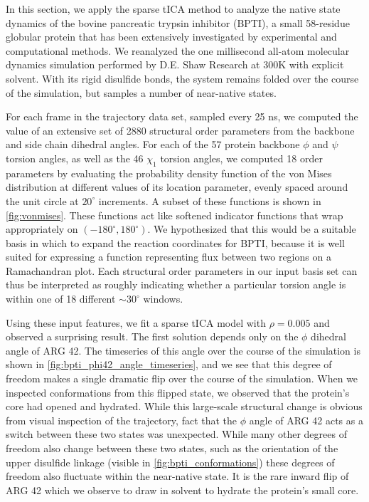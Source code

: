 \documentclass[aip, jcp, reprint, nolinenumbers, twocolumn, nobalancelastpage, nofootinbib]{revtex4-1}
\begin{document}
In this section, we apply the sparse tICA method to analyze the native state dynamics of the bovine pancreatic trypsin inhibitor (BPTI), a small 58-residue globular protein that has been extensively investigated by experimental and computational methods. We reanalyzed the one millisecond all-atom molecular dynamics simulation performed by D.E. Shaw Research at 300K with explicit solvent.\cite{shaw2010atomic}  With its rigid disulfide bonds, the system remains folded over the course of the simulation, but samples a number of near-native states.

For each frame in the trajectory data set, sampled every 25 ns, we computed the value of an extensive set of 2880 structural order parameters from the backbone and side chain dihedral angles. For each of the 57 protein backbone $\phi$ and $\psi$ torsion angles, as well as the 46 $\chi_1$ torsion angles, we computed 18 order parameters by evaluating the probability density function of the von Mises distribution at different values of its location parameter, evenly spaced around the unit circle at $20^\circ$ increments. A subset of these functions is shown in \cref{fig:vonmises}. These functions act like softened indicator functions that wrap appropriately on $(-180^\circ, 180^\circ)$. We hypothesized that this would be a suitable basis in which to expand the reaction coordinates for BPTI, because it is well suited for expressing a function representing flux between two regions on a Ramachandran plot. Each structural order parameters in our input basis set can thus be interpreted as roughly indicating whether a particular torsion angle is within one of 18 different $\sim 30^\circ$ windows.

Using these input features, we fit a sparse tICA model with $\rho=0.005$ and observed a surprising result. The first solution depends only on the $\phi$ dihedral angle of ARG 42. The timeseries of this angle over the course of the simulation is shown in \cref{fig:bpti_phi42_angle_timeseries}, and we see that this degree of freedom makes a single dramatic flip over the course of the simulation. When we inspected conformations from this flipped state, we observed that the protein's core had opened and hydrated. While this large-scale structural change is obvious from visual inspection of the trajectory, fact that the $\phi$ angle of ARG 42 acts as a switch between these two states was unexpected. While many other degrees of freedom also change between these two states, such as the orientation of the upper disulfide linkage (visible in \cref{fig:bpti_conformations}) these degrees of freedom also fluctuate within the near-native state. It is the rare inward flip of ARG 42 which we observe to draw in solvent to hydrate the protein's small core.
\end{document}
